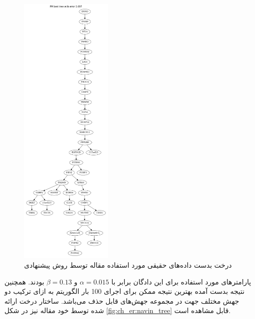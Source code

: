 \begin{figure}[!ht]
	\centering
	\includegraphics[width=0.4\textwidth]{img/chaps/er/pm2}
	\caption{درخت بدست داده‌های حقیقی مورد استفاده مقاله \cite{davis2016computing} توسط روش پیشنهادی}
	\label{fig:ch_er:pm_tree}
\end{figure}
\noindent
پارامترهای مورد استفاده برای این دادگان برابر با $\alpha=0.015$ و $\beta=0.13$ بودند. همچنین نتیجه بدست آمده بهترین نتیجه ممکن برای اجرای 100 بار الگوریتم به ازای ترکیب دو جهش مختلف جهت در مجموعه جهش‌های قابل حذف می‌باشد. ساختار درخت ارائه شده توسط خود مقاله نیز در شکل \ref{fig:ch_er:navin_tree} قابل مشاهده است.

